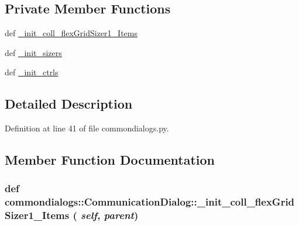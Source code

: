 \subsection*{Private Member Functions}
\begin{CompactItemize}
\item 
def \hyperlink{classcommondialogs_1_1CommunicationDialog_30ca89384143013c6f74c2a1350723ba}{\_\-init\_\-coll\_\-flex\-Grid\-Sizer1\_\-Items}
\item 
def \hyperlink{classcommondialogs_1_1CommunicationDialog_7273c6e406e4e14b27a7a4067f86ecff}{\_\-init\_\-sizers}
\item 
def \hyperlink{classcommondialogs_1_1CommunicationDialog_80e062462e3b696373dfd4debc1a2d67}{\_\-init\_\-ctrls}
\end{CompactItemize}


\subsection{Detailed Description}




Definition at line 41 of file commondialogs.py.

\subsection{Member Function Documentation}
\hypertarget{classcommondialogs_1_1CommunicationDialog_30ca89384143013c6f74c2a1350723ba}{
\subsubsection[\_\-init\_\-coll\_\-flexGridSizer1\_\-Items]{\setlength{\rightskip}{0pt plus 5cm}def commondialogs::Communication\-Dialog::\_\-init\_\-coll\_\-flex\-Grid\-Sizer1\_\-Items ( {\em self},  {\em parent})}}
\label{classcommondialogs_1_1CommunicationDialog_30ca89384143013c6f74c2a1350723ba}





